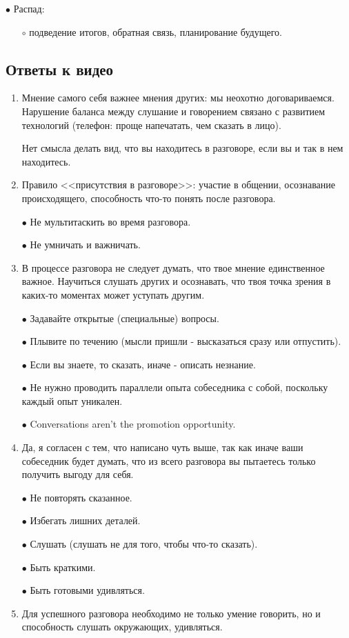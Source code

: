 \documentclass[12pt,a4paper]{report}
\begin{document}
$\bullet$ Распад:
\begin{itemize}
	\item[$\circ$] подведение итогов, обратная связь, планирование будущего.
\end{itemize}

\subsection*{Ответы к видео}
\begin{enumerate}
	\item Мнение самого себя важнее мнения других: мы неохотно договариваемся. Нарушение баланса между слушание и говорением связано с развитием технологий (телефон: проще напечатать, чем сказать в лицо).
	
	 Нет смысла делать вид, что вы находитесь в разговоре, если вы и так в нем находитесь.
	\item Правило <<присутствия в разговоре>>: участие в общении, осознавание происходящего, способность что-то понять после разговора.
	
	\smallskip 
	$\bullet$ Не мультитаскить во время разговора.
	
	$\bullet$ Не умничать и важничать.
	
	\item  В процессе разговора не следует думать, что твое мнение единственное важное. Научиться слушать других и осознавать, что твоя точка зрения в каких-то моментах может уступать другим.
	
	\smallskip
	$\bullet$ Задавайте открытые (специальные) вопросы.
	
	$\bullet$ Плывите по течению (мысли пришли - высказаться сразу или отпустить).
	
	$\bullet$ Если вы знаете, то сказать, иначе - описать незнание.
	
	$\bullet$ Не нужно проводить параллели опыта собеседника с собой, поскольку каждый опыт уникален.
	
	$\bullet$ Conversations aren't the promotion opportunity.
	
	\item Да, я согласен с тем, что написано чуть выше, так как иначе ваши собеседник будет думать, что из всего разговора вы пытаетесь только получить выгоду для себя.
	
	\smallskip
	$\bullet$ Не повторять сказанное.
	
	$\bullet$ Избегать лишних деталей.
	
	$\bullet$ Слушать (слушать не для того, чтобы что-то сказать).
	
	$\bullet$ Быть краткими.
	
	$\bullet$ Быть готовыми удивляться.
	
	\item Для успешного разговора необходимо не только умение говорить, но и способность слушать окружающих, удивляться.
\end{enumerate}
\end{document}
